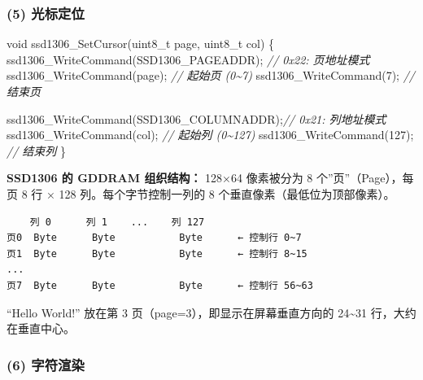 \documentclass[
  chinese,
  UTF8,
  oneside,
  openany]{ctexbook}
\newenvironment{Shaded}{}{}
\newcommand{\CommentTok}[1]{\textcolor[rgb]{0.38,0.63,0.69}{\textit{#1}}}
\newcommand{\DataTypeTok}[1]{\textcolor[rgb]{0.56,0.13,0.00}{#1}}
\newcommand{\DecValTok}[1]{\textcolor[rgb]{0.25,0.63,0.44}{#1}}
\newcommand{\NormalTok}[1]{#1}
\newcommand{\OperatorTok}[1]{\textcolor[rgb]{0.40,0.40,0.40}{#1}}
\begin{document}
\subsubsection{(5) 光标定位}\label{ux5149ux6807ux5b9aux4f4d}

\begin{Shaded}
\begin{Highlighting}[]
\DataTypeTok{void}\NormalTok{ ssd1306\_SetCursor}\OperatorTok{(}\DataTypeTok{uint8\_t}\NormalTok{ page}\OperatorTok{,} \DataTypeTok{uint8\_t}\NormalTok{ col}\OperatorTok{)}
\OperatorTok{\{}
\NormalTok{    ssd1306\_WriteCommand}\OperatorTok{(}\NormalTok{SSD1306\_PAGEADDR}\OperatorTok{);}  \CommentTok{// 0x22: 页地址模式}
\NormalTok{    ssd1306\_WriteCommand}\OperatorTok{(}\NormalTok{page}\OperatorTok{);}              \CommentTok{// 起始页 (0\textasciitilde{}7)}
\NormalTok{    ssd1306\_WriteCommand}\OperatorTok{(}\DecValTok{7}\OperatorTok{);}                 \CommentTok{// 结束页}

\NormalTok{    ssd1306\_WriteCommand}\OperatorTok{(}\NormalTok{SSD1306\_COLUMNADDR}\OperatorTok{);}\CommentTok{// 0x21: 列地址模式}
\NormalTok{    ssd1306\_WriteCommand}\OperatorTok{(}\NormalTok{col}\OperatorTok{);}               \CommentTok{// 起始列 (0\textasciitilde{}127)}
\NormalTok{    ssd1306\_WriteCommand}\OperatorTok{(}\DecValTok{127}\OperatorTok{);}               \CommentTok{// 结束列}
\OperatorTok{\}}
\end{Highlighting}
\end{Shaded}

\textbf{SSD1306 的 GDDRAM 组织结构：} 128×64 像素被分为 8
个''页''（Page），每页 8 行 × 128 列。每个字节控制一列的 8
个垂直像素（最低位为顶部像素）。

\begin{verbatim}
    列 0      列 1    ...    列 127
页0  Byte      Byte           Byte      ← 控制行 0~7
页1  Byte      Byte           Byte      ← 控制行 8~15
...
页7  Byte      Byte           Byte      ← 控制行 56~63
\end{verbatim}

``Hello World!'' 放在第 3 页（page=3），即显示在屏幕垂直方向的
24\textasciitilde31 行，大约在垂直中心。

\subsubsection{(6) 字符渲染}\label{ux5b57ux7b26ux6e32ux67d3}
\end{document}
